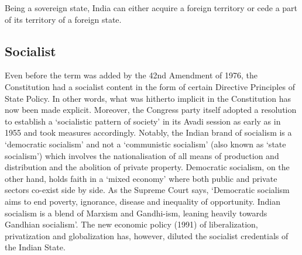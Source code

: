 Being a sovereign state, India can either acquire a foreign territory or cede a part of its territory of a foreign state.

\subsection{Socialist}

Even before the term was added by the 42nd Amendment of 1976, the Constitution had a socialist content in the form of certain Directive Principles of State Policy. In other words, what was hitherto implicit in the Constitution has now been made explicit. Moreover, the Congress party itself adopted a resolution to establish a `socialistic pattern of society' in its Avadi session as early as in 1955 and took measures accordingly. Notably, the Indian brand of socialism is a `democratic socialism' and not a `communistic socialism' (also known as `state socialism') which involves the nationalisation of all means of production and distribution and the abolition of private property. Democratic socialism, on the other hand, holds faith in a `mixed economy' where both public and private sectors co-exist side by side. As the Supreme Court says, `Democratic socialism aims to end poverty, ignorance, disease and inequality of opportunity. Indian socialism is a blend of Marxism and Gandhi-ism, leaning heavily towards Gandhian socialism'. The new economic policy (1991) of liberalization, privatization and globalization has, however, diluted the socialist credentials of the Indian State.

\twocolumn
\printendnotes
\cleardoublepage

%


